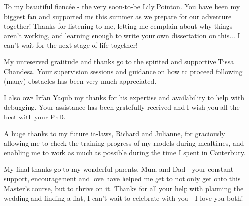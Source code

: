 \cleardoublepage


\begin{acknowledgements}

To my beautiful fiancée - the very soon-to-be Lily Pointon. You have been my biggest fan and supported me this summer as we prepare for our adventure together! Thanks for listening to me, letting me complain about why things aren't working, and learning enough to write your own dissertation on this... I can't wait for the next stage of life together! 

My unreserved gratitude and thanks go to the spirited and supportive Tissa Chandesa. Your supervision sessions and guidance on how to proceed following (many) obstacles has been very much appreciated.

I also owe Irfan Yaqub my thanks for his expertise and availability to help with debugging. Your assistance has been gratefully received and I wish you all the best with your PhD.

A huge thanks to my future in-laws, Richard and Julianne, for graciously allowing me to check the training progress of my models during mealtimes, and enabling me to work as much as possible during the time I spent in Canterbury.

My final thanks go to my wonderful parents, Mum and Dad - your constant support, encouragement and love have helped me get to not only get onto this Master's course, but to thrive on it. Thanks for all your help with planning the wedding and finding a flat, I can't wait to celebrate with you - I love you both!

\end{acknowledgements}